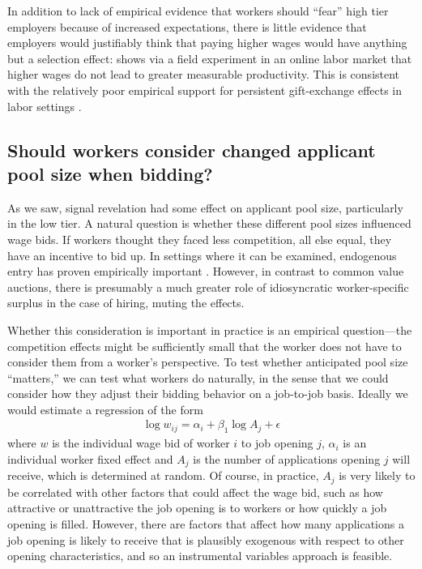 \documentclass[12pt]{article}
\begin{document}


In addition to lack of empirical evidence that workers should ``fear'' high tier employers because of increased expectations, there is little evidence that employers would justifiably think that paying higher wages would have anything but a selection effect: 
\cite{gilchrist20163} shows via a field experiment in an online labor market that higher wages do not lead to greater measurable productivity.
This is consistent with the relatively poor empirical support for persistent gift-exchange effects in labor settings \citep{gneezy2006putting}. 

\subsection{Should workers consider changed applicant pool size when bidding?} \label{sec:condition_on_pool_size}
As we saw, signal revelation had some effect on applicant pool size, particularly in the low tier.
A natural question is whether these different pool sizes influenced wage bids.
If workers thought they faced less competition, all else equal, they have an incentive to bid up.
In settings where it can be examined, endogenous entry has proven empirically important \citep{bajari2003winner}. However, in contrast to common value auctions, there is presumably a much greater role of idiosyncratic worker-specific surplus in the case of hiring, muting the effects.  

Whether this consideration is important in practice is an empirical question---the competition effects might be sufficiently small that the worker does not have to consider them from a worker's perspective.
To test whether anticipated pool size ``matters,'' we can test what workers do naturally, in the sense that we could consider how they adjust their bidding behavior on a job-to-job basis. 
Ideally we would estimate a regression of the form 
\begin{align} \label{eq:endog_bidding}
  \log w_{ij} = \alpha_i + \beta_1 \log A_{j} + \epsilon
\end{align} 
where $w$ is the individual wage bid of worker $i$ to job opening $j$, $\alpha_i$ is an individual worker fixed effect and $A_j$ is the number of applications opening $j$ will receive, which is determined at random.
Of course, in practice, $A_j$ is very likely to be correlated with other factors that could affect the wage bid, such as how attractive or unattractive the job opening is to workers or how quickly a job opening is filled.
However, there are factors that affect how many applications a job opening is likely to receive that is plausibly exogenous with respect to other opening characteristics, and so an instrumental variables approach is feasible. 
\end{document}
